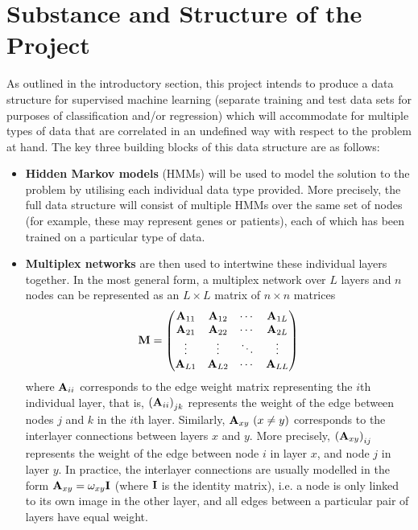 \section*{Substance and Structure of the Project}
As outlined in the introductory section, this project intends to produce a data structure for supervised machine learning (separate training and test data sets for purposes of classification and/or regression) which will accommodate for multiple types of data that are correlated in an undefined way with respect to the problem at hand. The key three building blocks of this data structure are as follows:
\begin{itemize}
    \item \textbf{Hidden Markov models} (HMMs) will be used to model the solution to the problem by utilising each individual data type provided. More precisely, the full data structure will consist of multiple HMMs over the same set of nodes (for example, these may represent genes or patients), each of which has been trained on a particular type of data.
    \item \textbf{Multiplex networks} are then used to intertwine these individual layers together. In the most general form, a multiplex network over $L$ layers and $n$ nodes can be represented as an $L \times L$ matrix of $n \times n$ matrices
    \[
        \bf M =
 \begin{pmatrix}
  {\bf A}_{11} & {\bf A}_{12} & \cdots & {\bf A}_{1L} \\
  {\bf A}_{21} & {\bf A}_{22} & \cdots & {\bf A}_{2L} \\
  \vdots  & \vdots  & \ddots & \vdots  \\
  {\bf A}_{L1} & {\bf A}_{L2} & \cdots & {\bf A}_{LL}
 \end{pmatrix}
    \]
    where ${\bf A}_{ii}$ corresponds to the edge weight matrix representing the $i$th individual layer, that is, $\left({\bf A}_{ii}\right)_{jk}$ represents the weight of the edge between nodes $j$ and $k$ in the $i$th layer. Similarly, ${{\bf A}_{xy}}\ (x \neq y)$ corresponds to the interlayer connections between layers $x$ and $y$. More precisely, $\left({\bf A}_{xy}\right)_{ij}$ represents the weight of the edge between node $i$ in layer $x$, and node $j$ in layer $y$. In practice, the interlayer connections are usually modelled in the form ${{\bf A}_{xy}} = \omega_{xy} \bf I$ (where $\bf I$ is the identity matrix), i.e. a node is only linked to its own image in the other layer, and all edges between a particular pair of layers have equal weight. \\ \\

\end{itemize}

